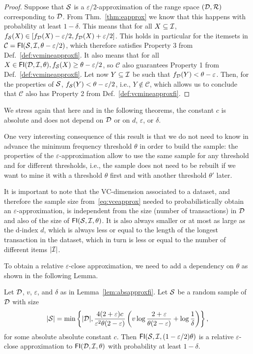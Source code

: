 \begin{proof}
  Suppose that ${\cal S}$ is a $\varepsilon/2$-approximation of the range space
  $({\cal D},\mathcal{R})$ corresponding
  to ${\cal D}$. From Thm.~\ref{thm:eapprox} we know that this happens with probability at least $1-\delta$.  
  This means that for all $X\subseteq{\cal I}$,
  $f_{\cal S}(X)\in[f_{\cal D}(X)-\varepsilon/2,f_{\cal D}(X)+\varepsilon/2]$.
  This holds in particular for the itemsets in
  $\mathcal{C}=\mathsf{FI}({\cal S},{\cal I},\theta-\varepsilon/2)$, which therefore satisfies
  Property 3 from Def.~\ref{def:vcmineapproxfi}. It also means that for all $X\in\mathsf{FI}({\cal D},{\cal I},\theta),
  f_{\cal S}(X)\ge \theta-\varepsilon/2$, so $\mathcal{C}$ also guarantees Property
  1 from Def.~\ref{def:vcmineapproxfi}. Let now $Y\subseteq{\cal I}$ be such that
  $f_{\cal D}(Y)< \theta-\varepsilon$. Then, for the properties of ${\cal S}$,
  $f_{\cal S}(Y)<\theta-\varepsilon/2$, i.e., $Y\notin \mathcal{C}$, which allows us
  to conclude that $\mathcal{C}$ also has Property 2 from Def.~\ref{def:vcmineapproxfi}.
\end{proof}

We stress again that here and in the following theorems, the constant $c$ is
absolute and does not depend on ${\cal D}$ or on $d$, $\varepsilon$, or $\delta$.

One very interesting consequence of this result is that we do not need to know
in advance the minimum frequency threshold $\theta$ in order to build the
sample: the properties of the $\varepsilon$-approximation allow to use the same
sample for any threshold and for different thresholds, i.e., the sample does not
need to be rebuilt if we want to mine it with a threshold $\theta$ first and
with another threshold $\theta'$ later.

It is important to note that the VC-dimension associated to a dataset, and
therefore the sample size from~\eqref{eq:vceapprox} needed to probabilistically
obtain an $\varepsilon$-approximation, is independent from the size (number of
transactions) in ${\cal D}$ and also of the size of $\mathsf{FI}({\cal S},{\cal I},\theta)$. It is
also always smaller or at most as large as the d-index $d$, which is always less
or equal to the length of the longest transaction in the dataset, which in turn
is less or equal to the number of different items $|{\cal I}|$.

To obtain a relative $\varepsilon$-close approximation, we
need to add a dependency on $\theta$ as shown in the following Lemma.

\begin{lemma}\label{lem:relapproxfi}
  Let ${\cal D}$, $v$, $\varepsilon$, and $\delta$ as in Lemma~\ref{lem:absapproxfi}. Let
  ${\cal S}$ be a random sample of ${\cal D}$ with size 
  \[
  |{\cal S}| =
  \min\left\{|{\cal D}|,\frac{4(2+\varepsilon)c}{\varepsilon^2\theta(2-\varepsilon)}\left(v\log\frac{2+\varepsilon}{\theta(2-\varepsilon)}+\log\frac{1}{\delta}\right)\right\},\]
  for some absolute absolute constant $c$. Then $\mathsf{FI}({\cal S},{\cal I},(1-\varepsilon/2)\theta)$ is a relative
  $\varepsilon$-close approximation to $\mathsf{FI}({\cal D},{\cal I},\theta)$ with probability
  at least $1-\delta$.
\end{lemma}

